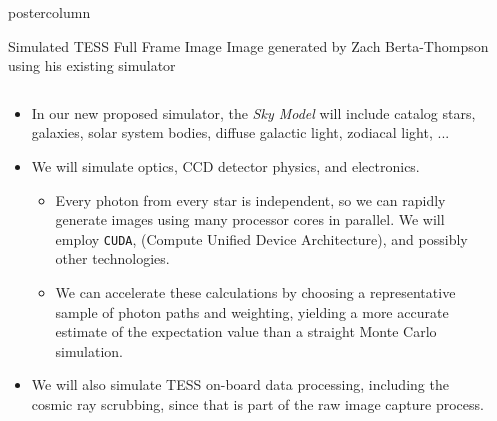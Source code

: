 \documentclass[final,hyperref={pdfpagelabels=false}]{beamer}
\newlength{\columnheight}
\begin{document}
\begin{frame}
\begin{columns}
    \begin{column}{.49\textwidth}
      \begin{beamercolorbox}[center,wd=\textwidth]{postercolumn}
        \begin{minipage}[T]{.95\textwidth}
          \parbox[t][\columnheight]{\textwidth}{
            \begin{block}{Simulated TESS Full Frame Image}
            Image generated by Zach Berta-Thompson using his existing simulator
              \begin{columns}
                \begin{column}{.70\textwidth}
                \begin{itemize}
                    \item In our new proposed simulator, the \emph{Sky Model} will include catalog stars, galaxies, solar system bodies, diffuse galactic light, zodiacal light, ...
                    \vfill
                    \item We will simulate optics, CCD detector physics, and electronics.
                    \begin{itemize}
                    	\item Every photon from every star is independent, so we can rapidly generate images using many processor cores in parallel. We will employ \texttt{CUDA}, (Compute Unified Device Architecture), and possibly other technologies. 
			\item We can accelerate these calculations by choosing a representative sample of photon paths and weighting, yielding a more accurate estimate of the expectation value than a straight Monte Carlo simulation.
                    \end{itemize}
                    \vfill
                    \item We will also simulate TESS on-board data processing, including the cosmic ray scrubbing, since that is part of the raw image capture process.
                    \vfill
                \end{itemize}
                \end{column}
                \begin{column}{.28\textwidth}

\end{column}
\end{columns}
\end{block}}
\end{minipage}
\end{beamercolorbox}
\end{column}
\end{columns}
\end{frame}
\end{document}
